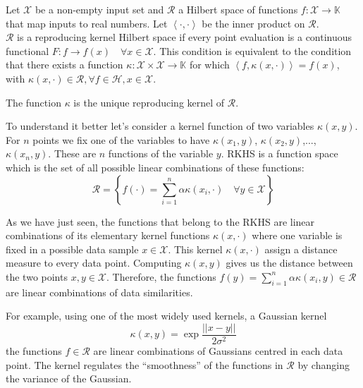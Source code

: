 \begin{definicion}[RKHS]
    Let $\mathcal{X}$ be a non-empty input set and $\mathcal{R}$ a Hilbert space of functions $f:\mathcal{X} \longrightarrow \mathbb{K}$ that map inputs to real numbers. Let $\left< \cdot, \cdot \right>$ be the inner product on $\mathcal{R}$. \\$\mathcal{R}$ is a reproducing kernel Hilbert space if every point evaluation is a continuous functional $ F: f \longrightarrow f(x) \quad \forall x \in \mathcal{X}$. This condition is equivalent to the condition that there exists a function $\kappa : \mathcal{X} \times \mathcal{X} \longrightarrow \mathbb{K}$ for which $\left< f, \kappa(x,\cdot)\right> = f(x)$, with $\kappa(x,\cdot) \in \mathcal{R}, \forall f \in \mathcal{H}, x \in \mathcal{X}$. 
    
    The function $\kappa$ is the unique reproducing kernel of $\mathcal{R}$. 
    
\end{definicion}

To understand it better let's consider a kernel function of two variables $\kappa(x,y)$. For $n$ points we fix one of the variables to have $\kappa(x_1,y)$, $\kappa(x_2,y)$,..., $\kappa(x_n,y)$. These are $n$ functions of the variable $y$. RKHS is a function space which is the set of all possible linear combinations of these functions:
\begin{equation}
    \mathcal{R} = \left\lbrace f(\cdot)=\sum_{i=1}^{n} \alpha \kappa(x_i, \cdot) \quad \forall y \in \mathcal{X} \right\rbrace
\end{equation}

As we have just seen, the functions that belong to the RKHS are linear combinations of its elementary kernel functions $\kappa(x,\cdot)$ where one variable is fixed in a possible data sample $x \in \mathcal{X}$. This kernel $\kappa(x,\cdot)$ assign a distance measure to every data point. Computing $\kappa(x,y)$ gives us the distance between the two points $x,y \in \mathcal{X}$. 
Therefore, the functions $ f(y)=\sum_{i=1}^{n} \alpha \kappa(x_i, y) \in \mathcal{R}$ are linear combinations of data similarities. 

For example, using one of the most widely used kernels, a Gaussian kernel $$\kappa(x,y)=\exp{\frac{|| x-y || }{2 \sigma^2}}$$ the functions $f \in \mathcal{R}$ are linear combinations of Gaussians centred in each data point. The kernel regulates the ``smoothness'' of the functions in $\mathcal{R}$ by changing the variance of the Gaussian. 

